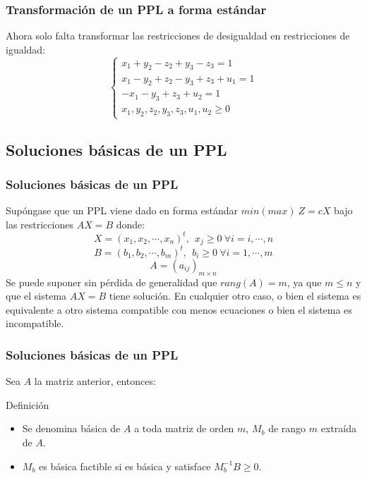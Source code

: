 \documentclass{beamer}
\begin{document}
\begin{frame}
\frametitle{Transformaci\'on de un PPL a forma est\'andar}
Ahora solo falta transformar las restricciones de desigualdad en restricciones de igualdad:
\[\left\{\begin{array}{l}x_1+y_2-z_2+y_3-z_3  = 1 \\x_1-y_2+z_2-y_3+z_3 +u_1=  1 \\ -x_1-y_3+z_3 + u_2 = 1\\x_1,y_2,z_2, y_3, z_3, u_1, u_2\geq 0 \end{array}\right.\]
\end{frame}


\subsection{Soluciones b\'asicas de un PPL}
\begin{frame}
\frametitle{Soluciones b\'asicas de un PPL}
Sup\'ongase que un PPL viene dado en forma est\'andar $min(max)\ Z = cX$ bajo las restricciones $AX=B$ donde:
\[X=(x_1,x_2,\cdots, x_n)^t, \ \ x_j\geq 0 \ \forall i = i,\cdots, n\]
\[B=(b_1,b_2,\cdots, b_m)^t, \ \ b_i\geq 0 \ \forall i =1,\cdots, m\]
\[A=(a_{ij})_{m\times n}\]
Se puede suponer sin p\'erdida de generalidad que $rang(A) = m$, ya que $m\leq n$ y que el sistema $AX=B$ tiene soluci\'on. En cualquier otro caso, o bien el sistema es equivalente a otro sistema compatible con menos ecuaciones o bien el sistema es incompatible.
\end{frame}



\begin{frame}
\frametitle{Soluciones b\'asicas de un PPL}
Sea $A$ la matriz anterior, entonces:
\begin{block}{Definici\'on}
\begin{itemize}
\item Se denomina b\'asica de $A$ a toda matriz de orden $m$, $M_b$ de rango $m$ extra\'ida de $A$.
\item $M_b$ es b\'asica factible si es b\'asica y satisface $M_b^{-1}B\geq 0$.

\end{itemize}
\end{block}
\end{frame}
\end{document}
